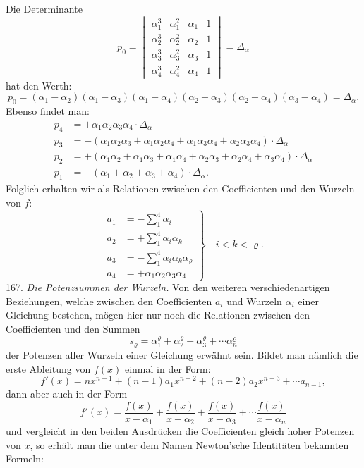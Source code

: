 \documentclass[11pt]{article}
\providecommand{\weberpage}[1]{}
\let\Delta\varDelta
\begin{document}
\weberpage{178}
Die Determinante
\[
p_0 =
\begin{vmatrix}
\alpha_1^{3} & \alpha_1^{2} & \alpha_1 & 1 \\
\alpha_2^{3} & \alpha_2^{2} & \alpha_2 & 1 \\
\alpha_3^{3} & \alpha_3^{2} & \alpha_3 & 1 \\
\alpha_4^{3} & \alpha_4^{2} & \alpha_4 & 1
\end{vmatrix}
= \Delta_\alpha
\]
hat den Werth:
\[
p_0 = (\alpha_1-\alpha_2)(\alpha_1-\alpha_3)(\alpha_1-\alpha_4)(\alpha_2-\alpha_3)(\alpha_2-\alpha_4)(\alpha_3-\alpha_4) = \Delta_\alpha.
\]
Ebenso findet man:
\[
\begin{aligned}
p_4 &= +\alpha_1\alpha_2\alpha_3\alpha_4 \cdot \Delta_\alpha \\
p_3 &= -(\alpha_1\alpha_2\alpha_3 + \alpha_1\alpha_2\alpha_4 + \alpha_1\alpha_3\alpha_4 + \alpha_2\alpha_3\alpha_4) \cdot \Delta_\alpha \\
p_2 &= +(\alpha_1\alpha_2 + \alpha_1\alpha_3 + \alpha_1\alpha_4 + \alpha_2\alpha_3 + \alpha_2\alpha_4 + \alpha_3\alpha_4) \cdot \Delta_\alpha \\
p_1 &= -(\alpha_1 + \alpha_2 + \alpha_3 + \alpha_4) \cdot \Delta_\alpha.
\end{aligned}
\]
Folglich erhalten wir als Relationen zwischen den Coefficienten und den Wurzeln von $f$:
\[
\left.
\begin{aligned}
a_1 &= -\sum_{1}^{4} \alpha_i \\
a_2 &= +\sum_{1}^{4} \alpha_i \alpha_k \\
a_3 &= -\sum_{1}^{4} \alpha_i \alpha_k \alpha_\varrho \\
a_4 &= +\alpha_1 \alpha_2 \alpha_3 \alpha_4
\end{aligned}
\right\}
\quad i < k < \varrho.
\]
167. \textit{Die Potenzsummen der Wurzeln.} Von den weiteren verschiedenartigen Beziehungen, welche zwischen den Coefficienten $a_i$ und Wurzeln $\alpha_i$ einer Gleichung bestehen, mögen hier nur noch die Relationen zwischen den Coefficienten und den Summen
\[
s_\varrho = \alpha_1^\varrho + \alpha_2^\varrho + \alpha_3^\varrho + \cdots \alpha_n^\varrho
\]
der Potenzen aller Wurzeln einer Gleichung erwähnt sein. Bildet man nämlich die erste Ableitung von $f(x)$ einmal in der Form:
\[
f'(x) = nx^{n-1} + (n-1)a_1 x^{n-2} + (n-2)a_2 x^{n-3} + \cdots a_{n-1},
\]
dann aber auch in der Form
\[
f'(x) = \frac{f(x)}{x-\alpha_1} + \frac{f(x)}{x-\alpha_2} + \frac{f(x)}{x-\alpha_3} + \cdots \frac{f(x)}{x-\alpha_n}
\]
und vergleicht in den beiden Ausdrücken die Coefficienten gleich hoher Potenzen von $x$, so erhält man die unter dem Namen \glqq Newton'sche Identitäten\grqq{} bekannten Formeln:
\end{document}

